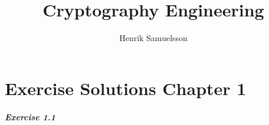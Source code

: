 \documentclass[]{article}
\title{Cryptography Engineering}
\author{Henrik Samuelsson}
\begin{document}
	\graphicspath{{./resources/}}
	\maketitle
	
	\section{Exercise Solutions Chapter 1}
	\subparagraph{Exercise 1.1}
	
		
	
	
\end{document}
